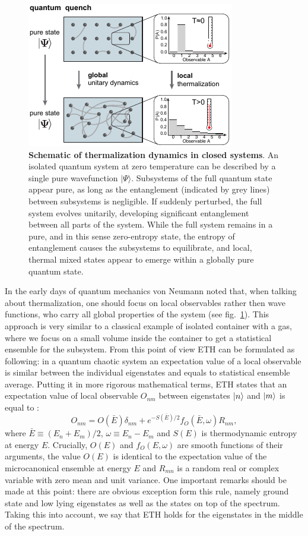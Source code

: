  \begin{figure}[t]
	\centering
	\includegraphics[scale=2]{figures/ETH_fig1.pdf}
	\caption{{\bf Schematic of thermalization dynamics in closed systems}.  An isolated quantum system at zero temperature can be described by a single pure wavefunction $\vert \Psi \rangle$. Subsystems of the full quantum state appear pure, as long as the entanglement (indicated by grey lines) between subsystems is negligible. If suddenly perturbed, the full system evolves unitarily, developing significant entanglement between all parts of the system. While the full system remains in a pure, and in this sense zero-entropy state, the entropy of entanglement causes the subsystems to equilibrate, and local, thermal mixed states appear to emerge within a globally pure quantum state.  }
	\label{fig:ETH_conceptual}
\end{figure}

In the early days of quantum mechanics von Neumann noted that, when talking about thermalization, one should focus on local observables rather then wave functions, who carry all global properties of the system (see fig.~\ref{fig:ETH_conceptual}). This approach is very similar to a classical example of isolated container with a gas, where we focus on a small volume inside the container to get a statistical ensemble for the subsystem. From this point of view ETH can be formulated as following: in a quantum chaotic system an expectation value of a local observable is similar between the individual eigenstates and equals to statistical ensemble average. Putting it in more rigorous mathematical terms, ETH states that an expectation value of local observable $O_{nm}$ between eigenstates $\left|n\right\rangle$ and $\left|m\right\rangle$ is equal to \cite{Srednicki1999}: 
\begin{equation}
O_{nm} = O(\bar{E}) \delta_{nm} + e^{-S(\bar{E})/2} f_O (\bar{E}, \omega) R_{nm},
\end{equation}
where $\bar{E} \equiv (E_n+E_m)/2$, $\omega \equiv E_n-E_m$ and $S(E)$ is thermodynamic entropy at energy $E$. Crucially, $O(E)$ and $f_O(E,\omega)$ are smooth functions of their arguments, the value $O(E)$ is identical to the expectation value of the microcanonical ensemble at energy $E$ and $R_{mn}$ is a random real or complex variable with zero mean and unit variance. One important remarks should be made at this point: there are obvious exception form this rule, namely ground state and low lying eigenstates as well as the states on top of the spectrum. Taking this into account, we say that ETH holds for the eigenstates in the middle of the spectrum. 

